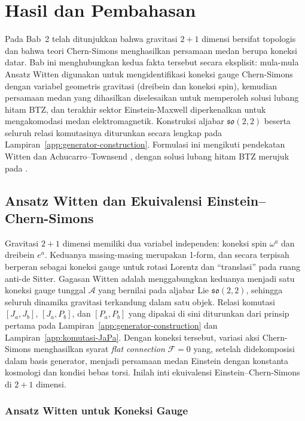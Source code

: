 \chapter{Hasil dan Pembahasan}

Pada Bab~2 telah ditunjukkan bahwa gravitasi $2+1$ dimensi bersifat topologis dan bahwa teori Chern-Simons menghasilkan persamaan medan berupa koneksi datar. Bab ini menghubungkan kedua fakta tersebut secara eksplisit: mula-mula Ansatz Witten digunakan untuk mengidentifikasi koneksi gauge Chern-Simons dengan variabel geometris gravitasi (dreibein dan koneksi spin), kemudian persamaan medan yang dihasilkan diselesaikan untuk memperoleh solusi lubang hitam BTZ, dan terakhir sektor Einstein-Maxwell diperkenalkan untuk mengakomodasi medan elektromagnetik. Konstruksi aljabar $\mathfrak{so}(2,2)$ beserta seluruh relasi komutasinya diturunkan secara lengkap pada Lampiran~\ref{app:generator-construction}. Formulasi ini mengikuti pendekatan Witten \cite{witten1988} dan Achucarro--Townsend \cite{achucarro1986}, dengan solusi lubang hitam BTZ merujuk pada \cite{banados1992, banados1993}.

\section{Ansatz Witten dan Ekuivalensi Einstein--Chern-Simons}
\label{sec:b4-witten}
 
Gravitasi $2+1$ dimensi memiliki dua variabel independen: koneksi spin $\omega^a$ dan dreibein $e^a$. Keduanya masing-masing merupakan 1-form, dan secara terpisah berperan sebagai koneksi gauge untuk rotasi Lorentz dan ``translasi'' pada ruang anti-de Sitter. Gagasan Witten adalah menggabungkan keduanya menjadi satu koneksi gauge tunggal $\mathcal{A}$ yang bernilai pada aljabar Lie $\mathfrak{so}(2,2)$, sehingga seluruh dinamika gravitasi terkandung dalam satu objek. Relasi komutasi $[J_a,J_b]$, $[J_a,P_b]$, dan $[P_a,P_b]$ yang dipakai di sini diturunkan dari prinsip pertama pada Lampiran~\ref{app:generator-construction} dan Lampiran~\ref{app:komutasi-JaPa}. Dengan koneksi tersebut, variasi aksi Chern-Simons menghasilkan syarat \emph{flat connection} $\mathcal{F}=0$ yang, setelah didekomposisi dalam basis generator, menjadi persamaan medan Einstein dengan konstanta kosmologi dan kondisi bebas torsi. Inilah inti ekuivalensi Einstein--Chern-Simons di $2+1$ dimensi.
 
\subsection{Ansatz Witten untuk Koneksi Gauge}
 
